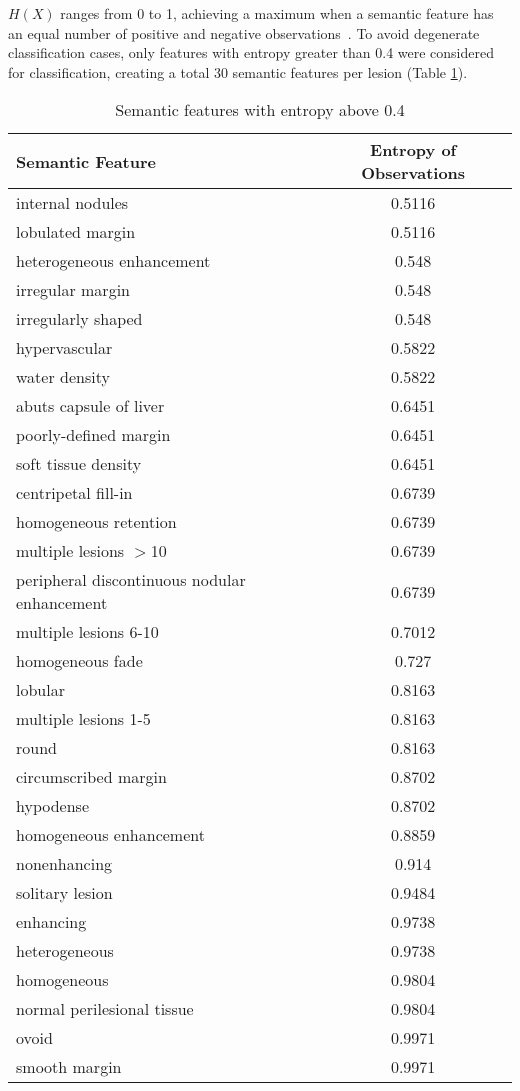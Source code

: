 $H(X)$ ranges from 0 to 1, achieving a maximum when a semantic feature has an equal number of positive and negative observations~\cite{MacKay:2003wc}. To avoid degenerate classification cases, only features with entropy greater than 0.4 were considered for classification, creating a total 30 semantic features per lesion (Table \ref{table:semanticfeaturelist}).

\begin{table}[ht!]
	\centering
	\begin{tabular}{|l|c|}
		\hline
		Semantic Feature & Entropy of Observations \\ \hline \hline
		internal nodules & 0.5116 \\ \hline
		lobulated margin & 0.5116 \\ \hline
		heterogeneous enhancement & 0.548 \\ \hline
		irregular margin & 0.548 \\ \hline
		irregularly shaped & 0.548 \\ \hline
		hypervascular & 0.5822 \\ \hline
		water density & 0.5822 \\ \hline
		abuts capsule of liver & 0.6451 \\ \hline
		poorly-defined margin & 0.6451 \\ \hline
		soft tissue density & 0.6451 \\ \hline
		centripetal fill-in & 0.6739 \\ \hline
		homogeneous retention & 0.6739 \\ \hline
		multiple lesions $>$10 & 0.6739 \\ \hline
		peripheral discontinuous nodular enhancement & 0.6739 \\ \hline
		multiple lesions 6-10 & 0.7012 \\ \hline
		homogeneous fade & 0.727 \\ \hline
		lobular & 0.8163 \\ \hline
		multiple lesions 1-5 & 0.8163 \\ \hline
		round & 0.8163 \\ \hline
		circumscribed margin & 0.8702 \\ \hline
		hypodense & 0.8702 \\ \hline
		homogeneous enhancement & 0.8859 \\ \hline
		nonenhancing & 0.914 \\ \hline
		solitary lesion & 0.9484 \\ \hline
		enhancing & 0.9738 \\ \hline
		heterogeneous & 0.9738 \\ \hline
		homogeneous & 0.9804 \\ \hline
		normal perilesional tissue & 0.9804 \\ \hline
		ovoid & 0.9971 \\ \hline
		smooth margin & 0.9971 \\ \hline
	\end{tabular}
	\caption{Semantic features with entropy above 0.4}
	\label{table:semanticfeaturelist}
\end{table}



